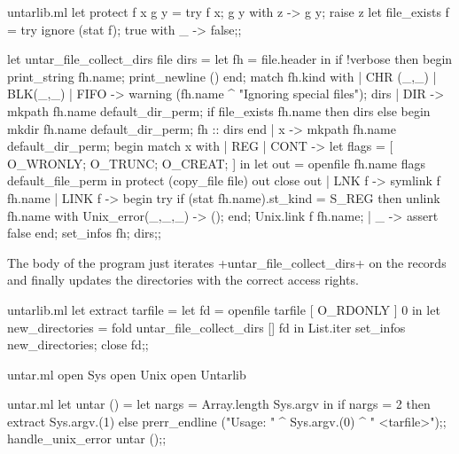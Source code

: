 \begin{answer}
\begin{listingcodefile}{untarlib.ml}
let protect f x g y = try f x; g y with z -> g y; raise z
let file_exists f = try ignore (stat f); true with _ -> false;;

let untar_file_collect_dirs file dirs =
  let fh = file.header in
  if !verbose then begin print_string fh.name; print_newline () end;
  match fh.kind with
  | CHR (_,_) | BLK(_,_) | FIFO -> 
      warning (fh.name ^ "Ignoring special files");
      dirs
  | DIR ->
      mkpath fh.name default_dir_perm;
      if file_exists fh.name then dirs
      else begin mkdir fh.name default_dir_perm; fh :: dirs end
  | x ->
      mkpath fh.name default_dir_perm;
      begin match x with 
      | REG | CONT ->
          let flags = [ O_WRONLY; O_TRUNC; O_CREAT; ] in
          let out = openfile fh.name flags default_file_perm in
          protect (copy_file file) out close out
      | LNK f ->
          symlink f fh.name
      | LINK f ->
          begin
            try if (stat fh.name).st_kind = S_REG then unlink fh.name
            with Unix_error(_,_,_) -> ();
          end;
          Unix.link f fh.name;
      | _ -> assert false
      end; 
      set_infos fh;
      dirs;;
\end{listingcodefile}
The body of the program just iterates \ml+untar_file_collect_dirs+ on
the records and finally updates the directories with the correct access
rights. 
%
\begin{listingcodefile}{untarlib.ml}
let extract tarfile =
  let fd = openfile tarfile [ O_RDONLY ] 0 in
  let new_directories = 
    fold untar_file_collect_dirs [] fd in
  List.iter set_infos new_directories;
  close fd;;
\end{listingcodefile}
%
\begin{codefile}{untar.ml}
open Sys
open Unix
open Untarlib
\end{codefile}
%
\begin{listingcodefile}{untar.ml}
let untar () =
  let nargs = Array.length Sys.argv in
  if nargs = 2 then extract Sys.argv.(1)
  else prerr_endline ("Usage: " ^ Sys.argv.(0) ^ " <tarfile>");;
handle_unix_error untar ();;
\end{listingcodefile}
\end{answer}

